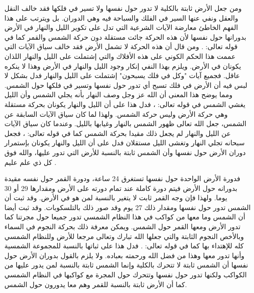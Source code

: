 ومن جعل الأرض ثابتة بالكلية لا تدور حول نفسها ولا تسير في فلكها فقد خالف النقل والعقل ونفي عنها السير  في الفلك والسباحة فيه وهي الدوران. بل ويترتب على هذا الفهم الخاطئ معارضة الآيات الشرعية التي تدل على تكوير الليل والنهار في الأرض بدورانها حول نفسها لأن هذه الحركة جائت مستقلة دون حركة الشمس والقمر كما في قوله تعالى: \quranayah*[21][33]{\footnotesize \surahname*[21]}\comment{\quranayah*[36][40]{\footnotesize (\surahname*[36])}}. ومن قال أن هذه الحركة لا تشمل الأرض فقد خالف سياق الآيات التي عممت هذا الحكم الكوني على هذه الأفلاك والتي إشتملت على الليل والنهار اللذان يكونان في الأرض. ويلزم بهذا النفي إنكار وجود الليل والنهار في الأرض وهذا لا ينكره عاقل. فجميع آيات "وكل في فلك يسبحون" إشتملت على الليل والنهار فدل بشكل لا لبس فيه أن الأرض في فلك تسبح أي تدور حول نفسها وتسير في فلكها حول الشمس. ومما يوضح هذا المعنى أن الله عز وجل وصف النهار بأنه يجلي الشمس وأن الليل يغشي الشمس في قوله تعالى: \quranayah*[91][1-4]{\footnotesize \surahname*[91]}، فدل هذا على أن الليل والنهار يكونان بحركة مستقلة وهي حركة الأرض وليس حركة الشمس. ولهذا لما كان سياق الآيات السابقة عن الشمس، جعل الله تعالى ظهور الشمس بالنهار وغيابها بالليل. وعندما كان سياق الآيات عن الليل والنهار لم يجعل ذلك مقيدا بحركة الشمس كما في قوله تعالى: \quranayah*[92][1-2]{\footnotesize \surahname*[92]}، فجعل سبحانه تجلي النهار وتغشى الليل مستقلان فدل على أن الليل والنهار يكونان بإستمرار دوران الأرض حول نفسها وأن الشمس ثابتة بالنسبة للأرض التي تدور عليها، والله فوق كل ذي علم عليم \href{https://www.youtube.com/watch?v=GnZ3dogED7w}{\faExternalLink}.

فدورة الأرض الواحدة حول نفسها تستغرق 24 ساعة، ودورة القمر حول نفسه مقيدة بدورانه حول الأرض فيتم دورة كاملة عند تمام دورته على الأرض ومقدارها 29 أو 30 يوما. ولهذا فإن وجه القمر ثابت لا يتغير بالنسبة لمن هو في الأرض. وقد ثبت أن الشمس تدور حول نفسها ومقدار ذلك 27 يوم وقد صور ذلك بالتلسكوبات. وقد ثبت أيضا أن الشمس وما معها من كواكب في هذا النظام الشمسي تدور جميعا حول مجرتنا كما تدور الأرض ومعها القمر حول الشمس. ويمكن معرفة ذلك بحركة النجوم في السماء وبالأخص النجوم الثابتة والتي جعلها الله تبارك وتعالى مرجعا للأرض وللنظام الشمسي كله للإهتداء بها كما في قوله تعالى: \quranayah*[6][97]{\footnotesize (\surahname*[6])}. فدل هذا على ثباتها بالنسبة للمجموعة الشمسية وأنها تدور معها وهذا من فضل الله ورحمته بعباده. ولا يلزم بالقول بدوران الأرض حول نفسها أن الشمس ثابتة لا تتحرك بالكلية وإنما الشمس ثابتة بالنسبة لمن يدور عليها من الكواكب ولكنها تدور حول نفسها وتتحرك حول المجرة مع كواكبها في النظام الشمسي كما أن الأرض ثابتة بالنسبة للقمر وهم معا يدورون حول الشمس.

